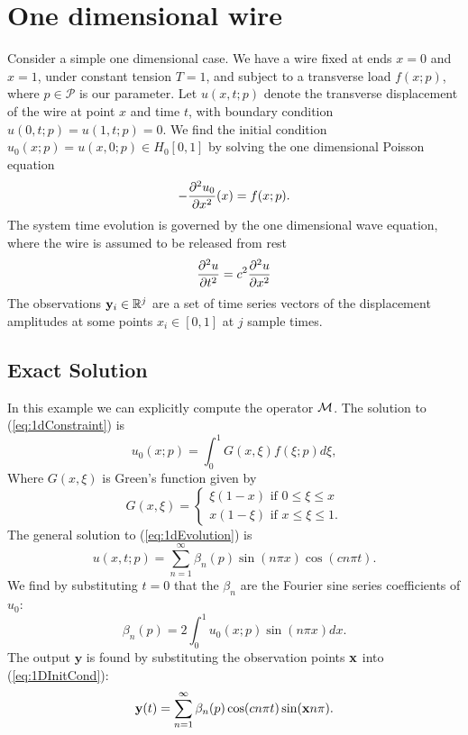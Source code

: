 \section{One dimensional wire}
Consider a simple one dimensional case. We have a wire fixed at ends $x=0$ and $x=1$, under constant tension $T=1$, and subject to a transverse load $f(x;p)$, where $p \in \mathcal{P}$ is our parameter. Let $u(x,t;p)$ denote the transverse displacement of the wire at point $x$ and time $t$, with boundary condition $u(0,t;p)=u(1,t;p)=0$. We find the initial condition $u_0(x;p)=u(x,0;p)\in H_0[0,1]$ by solving the one dimensional Poisson equation
\begin{equation}\label{eq:1dConstraint}
-\frac{{\partial}^2 u_0}{{\partial} x^2}(x) = f(x;p). 
\end{equation}
The system time evolution is governed by the one dimensional wave equation, where the wire is assumed to be released from rest
\begin{equation}\label{eq:1dEvolution}
\frac{{\partial}^2 u}{{\partial} t^2}=c^2 \frac{{\partial}^2 u}{{\partial} x^2}
\end{equation}
The observations $\mathbf{y}_i \in \mathbb{R}^j$ are a set of time series vectors of the displacement amplitudes at some points $x_i \in [0,1]$ at $j$ sample times. 

\subsection{Exact Solution}
In this example we can explicitly compute the operator $\mathcal{M}$. The solution to (\ref{eq:1dConstraint}) is 
\begin{equation}\label{eq:1DInitCond}
u_0(x;p)=\int_0^1 G(x,\xi) f(\xi;p) d \xi,
\end{equation}
Where $G(x,\xi)$ is Green's function given by
\begin{equation}
\label{eq:Greens}
G(x,\xi)=\begin{cases} \xi(1-x) \mbox{ if } 0\leq \xi \leq x \\
					  x(1-\xi) \mbox{ if } x \leq \xi \leq 1.
		\end{cases}
\end{equation}
The general solution to (\ref{eq:1dEvolution}) is
\begin{equation}\label{eq:1Ddisplacements}
u(x,t;p)=\sum^{\infty}_{n=1} \beta_n(p)\sin(n\pi x)\cos(c n \pi t). 
\end{equation}
We find by substituting $t=0$ that the $\beta_n$ are the Fourier sine series coefficients of $u_0$:
\begin{equation}
\beta_n(p)=2\int_0^1 u_0(x;p) \sin(n\pi x) dx.
\end{equation}
The output $\mathbf{y}$ is found by substituting the observation points ${\mathbf{x}}$ into (\ref{eq:1DInitCond}):
\begin{equation}\label{eq:1Doutput}
{\mathbf{y}}(t)=\sum^{\infty}_{n=1} \beta_n(p)\cos(c n \pi t)\sin({\mathbf{x}} n\pi).
\end{equation}


